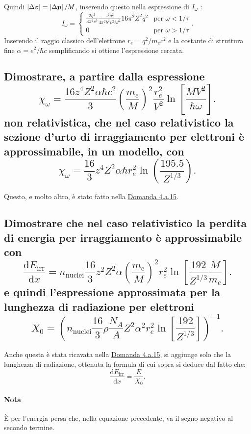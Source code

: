 Quindi $\left| \Delta \boldsymbol{v} \right| = \left| \Delta \boldsymbol{p} \right| /M$, inserendo questo nella espressione di $I_{\omega}$ :
\[
	I_{\omega}=
	\begin{cases}
		\frac{2q^2}{3\pi^2 c^3}\frac{z^2q^2}{4 \pi^2b^2v ^2M^2}16 \pi^2 Z^2 q^2  &\text{per } \omega< 1 /\tau\\  
		0 & \text{per } \omega > 1 /\tau
	\end{cases}
.\] 
Inserendo il raggio classico dell'elettrone $r_e = q^2 / m_e c^2$ e la costante di struttura fine $\alpha=e^2 / \hbar c$ semplificando si ottiene l'espressione cercata.

\subsection[ Sezione d'urto di irraggiamento nel caso di screening attivo]{Dimostrare, a partire dalla espressione
\[
	\chi_{\omega} = \frac{16 z^4 Z^2 \alpha \hbar c^2}{3} \left( \frac{m_e}{M} \right)^2 \frac{r_e^2}{V^2}\ln\left[ \frac{MV^2}{\hbar \omega} \right] 
.\] 
non relativistica, che nel caso relativistico la sezione d’urto di irraggiamento per elettroni è approssimabile, in un modello, con 
\[
	\chi_{\omega} = \frac{16}{3}z^4 Z^2\alpha\hbar r_e^2\ln\left( \frac{195.5}{Z^{1 /3}} \right) 
.\] 
}
\label{sec:4.b.8}
Questo, e molto altro, è stato fatto nella \hyperref[sec:4.a.15]{Domanda 4.a.15}.

\subsection[ Perdita di energia per irraggiamento nel caso relativistico]{Dimostrare che nel caso relativistico la perdita di energia per irraggiamento è approssimabile con 
\[
	\frac{\mbox{d} E_{\text{irr}}}{\mbox{d} x} = n_{\text{nuclei}} \frac{16}{3}z^2Z^2\alpha\left( \frac{m_e}{M} \right) ^2r_e^2\ln\left[ \frac{192}{Z^{1 /3}}\frac{M}{m_e} \right] 
.\] 
e quindi l'espressione approssimata per la lunghezza di radiazione per elettroni
\[
	X_0= \left( n_{\text{nuclei}} \frac{16}{3}\rho \frac{N_{A}}{A}  Z^2\alpha ^2r_e^2\ln\left[ \frac{192}{Z^{1 /3}}\right] \right)^{-1} 
.\] 
}
\label{sec:4.b.9}
Anche questa è stata ricavata nella \hyperref[sec:4.a.15]{Domanda 4.a.15}, si aggiunge solo che la lunghezza di radiazione, ottenuta la formula di cui sopra si deduce dal fatto che:
\[
	\frac{\mbox{d} E_{\text{irr}}}{\mbox{d} x} = \frac{E}{X_0}
.\] 
\paragraph{Nota}%
 È per l'energia persa che, nella equazione precedente, va il segno negativo al secondo termine.

